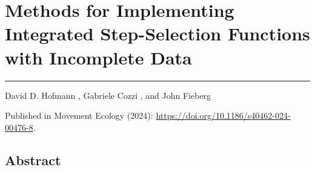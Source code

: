 \documentclass[../FinalThesis.tex]{subfiles}
\begin{document}
\chapter{Methods for Implementing Integrated Step-Selection Functions with
Incomplete Data}
\label{ChapterIrregularity}
\thispagestyle{empty}
\vspace{-1cm}
\noindent\hfil\rule{0.75\textwidth}{.4pt}\hfil

\begin{center}
David D. Hofmann ,
Gabriele Cozzi , and
John Fieberg 


\vfill

Published in Movement Ecology (2024):
\url{https://doi.org/10.1186/s40462-024-00476-8}.

%
%
%
%

\end{center}


%
%


\newpage
\section*{Abstract}
\end{document}
